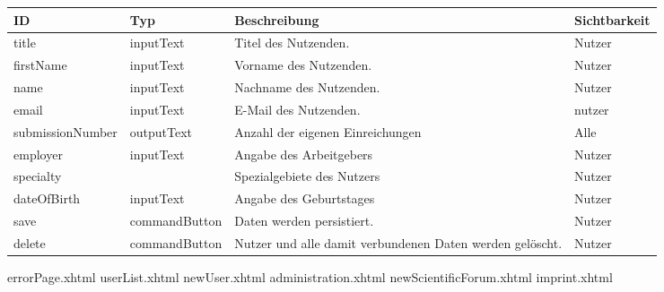 \begin{tabular}[H]{|m{2.5cm}|m{3cm}|m{6cm}|m{2.5cm}|}
    \hline
    \textbf{ID} & \textbf{Typ} & \textbf{Beschreibung} & \textbf{Sichtbarkeit} \\
    \hline
    \hline
    title & inputText & Titel des Nutzenden. & Nutzer\\
    \hline
    firstName & inputText & Vorname des Nutzenden. & Nutzer\\
    \hline
    name & inputText & Nachname des Nutzenden. & Nutzer\\
    \hline
    email & inputText & E-Mail des Nutzenden. & nutzer\\
    \hline
    submissionNumber & outputText & Anzahl der eigenen Einreichungen & Alle\\
    \hline
    employer & inputText & Angabe des Arbeitgebers & Nutzer \\
    \hline
    specialty & & Spezialgebiete des Nutzers & Nutzer \\
    \hline
    dateOfBirth & inputText & Angabe des Geburtstages & Nutzer\\
    \hline
    save & commandButton & Daten werden persistiert. & Nutzer\\
    \hline
    delete & commandButton & Nutzer und alle damit verbundenen Daten werden gelöscht. & Nutzer\\
    \hline
\end{tabular}


errorPage.xhtml
userList.xhtml
newUser.xhtml
administration.xhtml
newScientificForum.xhtml
imprint.xhtml
